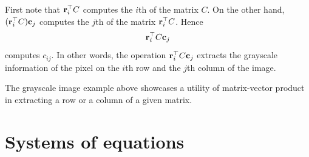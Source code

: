 \documentclass{ximera}
\begin{document}
\begin{example}
\begin{itemize}
\[    \]
  \end{itemize}
  \begin{explanation}
    First note that $\mathbf{r}_i^\top C$ computes the $i$th
     of the matrix
    $C$. On the other hand, $(\mathbf{r}_i^\top C)\mathbf{c}_j$ computes the $j$th
     of the matrix
    $\mathbf{r}_i^\top C$. Hence
    \[
      \mathbf{r}_i^\top C \mathbf{c}_j
    \]
    computes $c_{ij}$. In other words, the operation
    $\mathbf{r}_i^\top C \mathbf{c}_j$ extracts the grayscale information of the
    pixel on the $i$th row and the $j$th column of the image.
  \end{explanation}
\end{example}


The grayscale image example above showcases a utility of matrix-vector
product in extracting a row or a column of a given matrix.






\section{Systems of equations}
\end{document}
